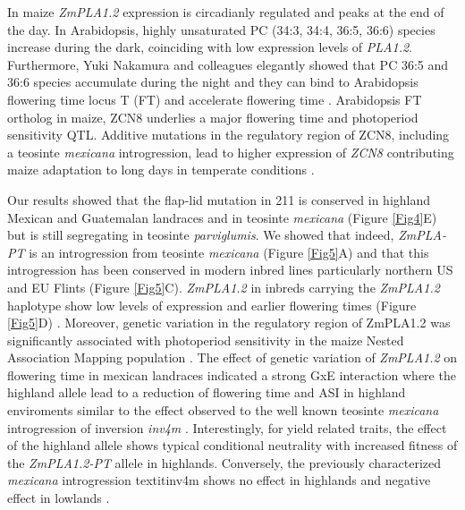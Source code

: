 \documentclass[9pt,twocolumn,twoside,lineno]{BioRxiv}
\begin{document}
In maize \textit{ZmPLA1.2} expression is circadianly regulated\cite{Khan2010-iv} and peaks at the end of the day. 
In Arabidopsis, highly unsaturated PC (34:3, 34:4, 36:5, 36:6) species increase during the dark\cite{Maatta2012-ip}, coinciding with low expression levels of \textit{PLA1.2}\cite{Khan2010-iv}.
Furthermore, Yuki Nakamura and colleagues elegantly showed that PC 36:5 and 36:6 species accumulate during the night and they can bind to Arabidopsis flowering time locus T (FT) and accelerate flowering time \cite{Nakamura2014-qf}. 
Arabidopsis FT ortholog in maize, ZCN8 \cite{Lazakis2011-nq} underlies a major flowering time and photoperiod sensitivity QTL.
Additive mutations in the regulatory region of ZCN8, including a teosinte \textit{mexicana} introgression, lead to higher expression of \textit{ZCN8} contributing maize adaptation to long days in temperate conditions \cite{Guo2019-pn}.

Our results showed that the flap-lid mutation in 211 is conserved in highland Mexican and Guatemalan landraces and in teosinte \textit{mexicana} (Figure \ref{Fig4}E) but is still segregating in teosinte \textit{parviglumis}. 
We showed that indeed, \textit{ZmPLA-PT} is an introgression from teosinte \textit{mexicana} (Figure \ref{Fig5}A) and that this introgression has been conserved in modern inbred lines particularly northern US and EU Flints (Figure \ref{Fig5}C). 
\textit{ZmPLA1.2} in inbreds carrying the \textit{ZmPLA1.2} haplotype show low levels of expression and earlier flowering times (Figure \ref{Fig5}D) \cite{Kremling2018-gn}. 
Moreover, genetic variation in the regulatory region of ZmPLA1.2 was significantly associated with photoperiod sensitivity in the maize Nested Association Mapping population \cite{Hung2012-ms}. 
The effect of genetic variation of \textit{ZmPLA1.2} on flowering time in mexican landraces indicated a strong GxE interaction where the highland allele lead to a reduction of flowering time and ASI in highland enviroments similar to the effect observed to the well known teosinte \textit{mexicana} introgression of inversion \textit{inv4m} \cite{Crow2020-gene}.
Interestingly, for yield related traits, the effect of the highland allele shows typical conditional neutrality with increased fitness of the \textit{ZmPLA1.2-PT} allele in highlands. 
Conversely, the previously characterized \textit{mexicana} introgression textit{inv4m} \cite{Gonzalez-Segovia2019-jy} shows no effect in highlands and negative effect in lowlands \cite{Crow2020-gene}.
\end{document}
